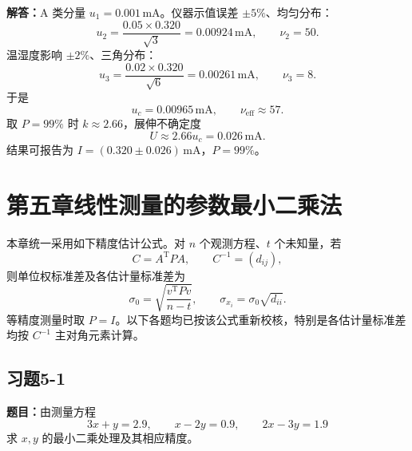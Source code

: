 \documentclass[UTF8,zihao=-4]{ctexart}
\newcommand{\problem}[1]{\subsection*{#1}}
\newcommand{\timu}{\noindent\textbf{题目：}}
\newcommand{\jieda}{\noindent\textbf{解答：}}
\begin{document}
{\jieda A 类分量 $u_1=0.001\,\mathrm{mA}$。仪器示值误差 $\pm5\%$、均匀分布：
\begin{equation*}
    u_2=\frac{0.05\times0.320}{\sqrt3}=0.00924\,\mathrm{mA},\qquad \nu_2=50.
\end{equation*}
温湿度影响 $\pm2\%$、三角分布：
\begin{equation*}
    u_3=\frac{0.02\times0.320}{\sqrt6}=0.00261\,\mathrm{mA},\qquad \nu_3=8.
\end{equation*}
于是
\begin{equation*}
    u_c=0.00965\,\mathrm{mA},\qquad \nu_{\mathrm{eff}}\approx57.
\end{equation*}
取 $P=99\%$ 时 $k\approx2.66$，展伸不确定度
\begin{equation*}
    U\approx2.66u_c=0.026\,\mathrm{mA}.
\end{equation*}
结果可报告为 $I=(0.320\pm0.026)\,\mathrm{mA}$，$P=99\%$。

\section*{第五章\quad 线性测量的参数最小二乘法}


本章统一采用如下精度估计公式。对 $n$ 个观测方程、$t$ 个未知量，若
\begin{equation*}
    C=A^{\mathrm T}PA,
    \qquad C^{-1}=(d_{ij}),
\end{equation*}
则单位权标准差及各估计量标准差为
\begin{equation*}
    \sigma_0=\sqrt{\frac{v^{\mathrm T}Pv}{n-t}},
    \qquad
    \sigma_{x_i}=\sigma_0\sqrt{d_{ii}}.
\end{equation*}
等精度测量时取 $P=I$。以下各题均已按该公式重新校核，特别是各估计量标准差均按 $C^{-1}$ 主对角元素计算。

\problem{习题5-1}
\timu 由测量方程
\begin{equation*}
    3x+y=2.9,\qquad x-2y=0.9,\qquad 2x-3y=1.9
\end{equation*}
求 $x,y$ 的最小二乘处理及其相应精度。

}
\end{document}
